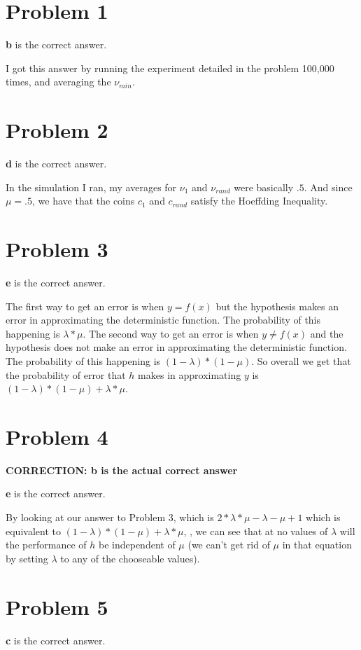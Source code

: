 \documentclass{article}
\begin{document}
\section*{Problem 1}
\textbf{b} is the correct answer.

\noindent I got this answer by running the experiment detailed in the problem 100,000
times, and averaging the $\nu_{min}$.
\section*{Problem 2}
\textbf{d} is the correct answer.

\noindent In the simulation I ran, my averages for $\nu_1$ and $\nu_{rand}$ were
basically $.5$. And since $\mu = .5$, we have that the coins $c_1$ and $c_{rand}$
satisfy the Hoeffding Inequality.
\section*{Problem 3}
\textbf{e} is the correct answer.

\noindent The first way to get an error is when $y = f(x)$ but
the hypothesis makes an error in approximating the deterministic function.
The probability of this happening is $\lambda * \mu$. The second way to get
an error is when $y \neq f(x)$ and the hypothesis does not
make an error in approximating the deterministic function. The probability of
this happening is $(1 - \lambda) * (1 - \mu)$. So overall we get that the
probability of error that $h$ makes in approximating $y$ is $(1 - \lambda) *
(1 - \mu) + \lambda * \mu$.
\section*{Problem 4}
\textbf{CORRECTION: b is the actual correct answer}

\noindent \textbf{e} is the correct answer.

\noindent By looking at our answer to Problem 3, which is $2*\lambda*\mu - \lambda
- \mu + 1$ which is equivalent to $(1 - \lambda) * (1 - \mu) + \lambda * \mu$,
, we can see that at no values of $\lambda$ will the performance of $h$
be independent of $\mu$ (we can't get rid of $\mu$ in that equation by setting
$\lambda$ to any of the chooseable values).
\section*{Problem 5}
\textbf{c} is the correct answer.
\end{document}
